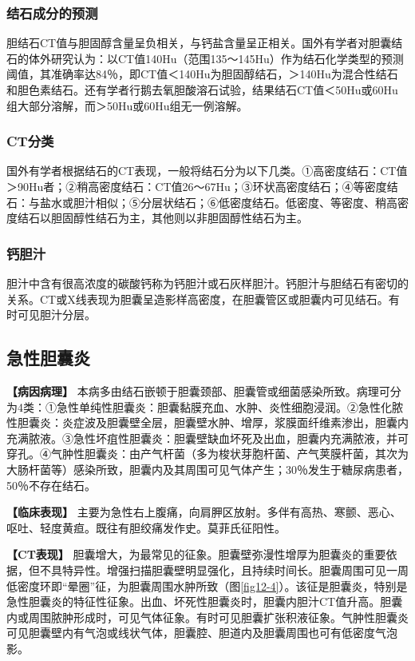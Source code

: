 \subsubsection{结石成分的预测}

胆结石CT值与胆固醇含量呈负相关，与钙盐含量呈正相关。国外有学者对胆囊结石的体外研究认为：以CT值140Hu（范围135～145Hu）作为结石化学类型的预测阈值，其准确率达84％，即CT值＜140Hu为胆固醇结石，＞140Hu为混合性结石和胆色素结石。还有学者行鹅去氧胆酸溶石试验，结果结石CT值＜50Hu或60Hu组大部分溶解，而＞50Hu或60Hu组无一例溶解。

\subsubsection{CT分类}

国外有学者根据结石的CT表现，一般将结石分为以下几类。①高密度结石：CT值＞90Hu者；②稍高密度结石：CT值26～67Hu；③环状高密度结石；④等密度结石：与盐水或胆汁相似；⑤分层状结石；⑥低密度结石。低密度、等密度、稍高密度结石以胆固醇性结石为主，其他则以非胆固醇性结石为主。

\subsubsection{钙胆汁}

胆汁中含有很高浓度的碳酸钙称为钙胆汁或石灰样胆汁。钙胆汁与胆结石有密切的关系。CT或X线表现为胆囊呈造影样高密度，在胆囊管区或胆囊内可见结石。有时可见胆汁分层。

\subsection{急性胆囊炎}

\textbf{【病因病理】}
本病多由结石嵌顿于胆囊颈部、胆囊管或细菌感染所致。病理可分为4类：①急性单纯性胆囊炎：胆囊黏膜充血、水肿、炎性细胞浸润。②急性化脓性胆囊炎：炎症波及胆囊壁全层，胆囊壁水肿、增厚，浆膜面纤维素渗出，胆囊内充满脓液。③急性坏疽性胆囊炎：胆囊壁缺血坏死及出血，胆囊内充满脓液，并可穿孔。④气肿性胆囊炎：由产气杆菌（多为梭状芽胞杆菌、产气荚膜杆菌，其次为大肠杆菌等）感染所致，胆囊内及其周围可见气体产生；30％发生于糖尿病患者，50％不存在结石。

\textbf{【临床表现】}
主要为急性右上腹痛，向肩胛区放射。多伴有高热、寒颤、恶心、呕吐、轻度黄疸。既往有胆绞痛发作史。莫菲氏征阳性。

\textbf{【CT表现】}
胆囊增大，为最常见的征象。胆囊壁弥漫性增厚为胆囊炎的重要依据，但不具特异性。增强扫描胆囊壁明显强化，且持续时间长。胆囊周围可见一周低密度环即“晕圈”征，为胆囊周围水肿所致（图\ref{fig12-4}）。该征是胆囊炎，特别是急性胆囊炎的特征性征象。出血、坏死性胆囊炎时，胆囊内胆汁CT值升高。胆囊内或周围脓肿形成时，可见气体征象。有时可见胆囊扩张积液征象。气肿性胆囊炎可见胆囊壁内有气泡或线状气体，胆囊腔、胆道内及胆囊周围也可有低密度气泡影。

